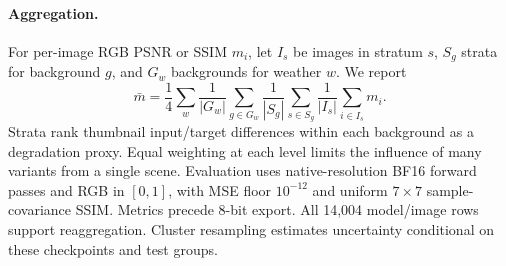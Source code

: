 \paragraph{Aggregation.}
For per-image RGB PSNR or SSIM $m_i$, let $I_s$ be images in stratum $s$, $S_g$ strata for background $g$, and $G_w$ backgrounds for weather $w$. We report
\begin{equation}
\bar m=\frac14\sum_w\frac1{|G_w|}\sum_{g\in G_w}
\frac1{|S_g|}\sum_{s\in S_g}\frac1{|I_s|}\sum_{i\in I_s}m_i.
\label{eq:metric}
\end{equation}
Strata rank thumbnail input/target differences within each background as a degradation proxy. Equal weighting at each level limits the influence of many variants from a single scene. Evaluation uses native-resolution BF16 forward passes and RGB in $[0,1]$, with MSE floor $10^{-12}$ and uniform $7\times7$ sample-covariance SSIM. Metrics precede 8-bit export. All 14,004 model/image rows support reaggregation. Cluster resampling estimates uncertainty conditional on these checkpoints and test groups.
